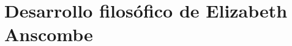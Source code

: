 \documentclass[./main.tex]{subfiles}
\begin{document}
\setcounter{chapter}{2}
\chapter{
Desarrollo filosófico de Elizabeth Anscombe
}




\end{document}
